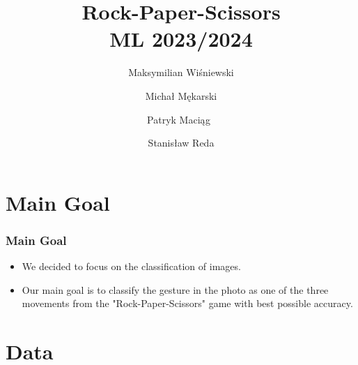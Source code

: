\documentclass{beamer}
\title{ \large{Rock-Paper-Scissors} \\ 
        \small{ML 2023/2024}}
\author{
    Maksymilian Wiśniewski \and
    Michał Mękarski \\ \and
    Patryk Maciąg  \and
    Stanisław Reda
}
\date{}
\begin{document}
\maketitle





\section{Main Goal}

\begin{frame}
    \frametitle{Main Goal}
    \begin{itemize}
        \item We decided to focus on the classification of images.

        \item Our main goal is to classify the gesture in the photo as one of the three movements from the "Rock-Paper-Scissors" game with best possible accuracy.
        
    \end{itemize}

\end{frame}


\section{Data}
\end{document}
